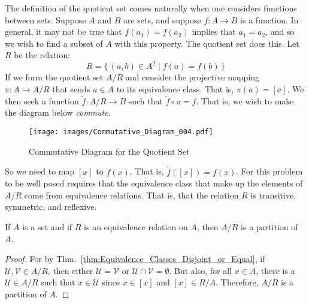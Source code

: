     \begin{example}
        The definition of the quotient set comes naturally when one considers
        functions between sets. Suppose $A$ and $B$ are sets, and suppose
        $f:A\rightarrow{B}$ is a function. In general, it may not be true that
        $f(a_{1})=f(a_{2})$ implies that $a_{1}=a_{2}$, and so we wish to find a
        subset of $A$ with this property. The quotient set does this. Let
        $R$ be the relation:
        \begin{equation}
            R=\{\,(a,b)\in{A}^{2}\;|\;f(a)=f(b)\,\}
        \end{equation}
        If we form the quotient set $A/R$ and consider the projective mapping
        $\pi:A\rightarrow{A}/R$ that sends $a\in{A}$ to its equivalence class.
        That is, $\pi(a)=[a]$. We then seek a function
        $\tilde{f}:A/R\rightarrow{B}$ such that $\tilde{f}\circ{\pi}=f$.
        That is, we wish to make the diagram below \textit{commute}.
        \begin{figure}[H]
            \centering
            \texttt{[image: images/Commutative\_Diagram\_004.pdf]}
            \label{fig:Comm_Diagram_Quotient_Set}
            \caption{Commutative Diagram for the Quotient Set}
        \end{figure}
        So we need to map $[x]$ to $f(x)$. That is, $\tilde{f}([x])=f(x)$. For
        this problem to be well posed requires that the equivalence class that
        make up the elements of $A/R$ come from equivalence relations. That is,
        that the relation $R$ is transitive, symmetric, and reflexive.
    \end{example}
    \begin{theorem}
        If $A$ is a set and if $R$ is an equivalence relation on $A$, then
        $A/R$ is a partition of $A$.
    \end{theorem}
    \begin{proof}
        For by Thm.~\ref{thm:Equivalence_Classes_Disjoint_or_Equal}, if
        $\mathcal{U},\mathcal{V}\in{A}/R$, then either
        $\mathcal{U}=\mathcal{V}$ or $\mathcal{U}\cap\mathcal{V}=\emptyset$.
        But also, for all $x\in{A}$, there is a $\mathcal{U}\in{A}/R$ such that
        $x\in\mathcal{U}$ since $x\in[x]$ and $[x]\in{R}/A$. Therefore,
        $A/R$ is a partition of $A$.
    \end{proof}